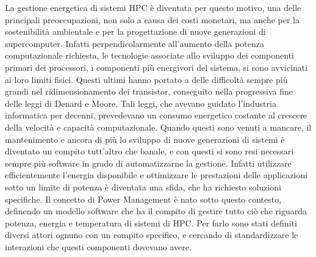 La gestione energetica di sistemi HPC è diventata per questo motivo, una delle principali preoccupazioni, non solo a causa dei costi monetari, ma anche per la sostenibilità ambientale e per la progettazione di nuove generazioni\cite{TODO} di supercomputer. Infatti perpendicolarmente all'aumento della potenza computazionale richiesta, le tecnologie associate allo sviluppo dei componenti primari dei processori, i componenti più energivori del sistema, si sono avvicinati ai loro limiti fisici.
Questi ultimi hanno portato a delle difficoltà sempre più grandi nel ridimensionamento dei transistor, conseguito nella progressiva fine delle leggi di Denard e Moore\cite{TODO}. Tali leggi, che avevano guidato l'industria informatica per decenni, prevedevano un consumo energetico costante al crescere della velocità e capacità computazionale. Quando questi sono venuti a mancare, il mantenimento e ancora di più lo sviluppo di nuove generazioni di sistemi è diventato un compito tutt'altro che banale, e con questi si sono resi necessari sempre più software in grado di automatizzarne la gestione. 
Infatti utilizzare efficientemente l'energia disponibile e ottimizzare le prestazioni delle applicazioni sotto un limite di potenza è diventata una sfida, che ha richiesto soluzioni specifiche. %
Il concetto di Power Management è nato sotto questo contesto, definendo un modello software che ha il compito di gestire tutto ciò che riguarda potenza, energia e temperatura di sistemi di HPC. Per farlo sono stati definiti diversi attori ognuno con un compito specifico, e cercando di standardizzare le interazioni che questi componenti dovevano avere.

